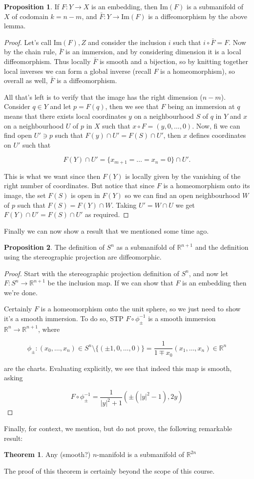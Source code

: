 \documentclass{article}
\theoremstyle{definition}
\newtheorem{proposition}{Proposition}
\newtheorem{theorem}{Theorem}
\begin{document}
\begin{proposition}
If $F: Y \to X$ is an embedding, then $\text{Im}(F)$ is a submanifold of $X$ of
codomain $k = n - m$, and $\bar{F} : Y \to \text{Im}(F)$ is a diffeomorphism by
the above lemma.
\end{proposition}

\begin{proof}
Let's call $\text{Im}(F), Z$ and consider the inclusion $i$ such that $i \circ
\bar{F} = F$. Now by the chain rule, $\bar{F}$ is an immersion, and by
considering dimension it is a local diffeomorphism. Thus locally $\bar{F}$ is
smooth and a bijection, so by knitting together local inverses we can form a
global inverse (recall $F$ is a homeomorphism), so overall as well, $\bar{F}$ is
a diffeomorphism.

All that's left is to verify that the image has the right dimension ($n - m$). Consider $q
\in Y$ and let $p = F(q)$, then we see that $F$ being an immersion at $q$ means
that there exists local coordinates $y$ on a neighbourhood $S$ of $q$ in $Y$ and
$x$ on a neighbourhood $U$ of $p$ in $X$ such that $x \circ F = (y, 0, \dots,
0)$. Now, fi we can find open $U' \ni p$ such that $F(y) \cap U' = F(S) \cap
U'$, then $x$ defines coordinates on $U'$ such that

$$ F(Y) \cap U' = \{x_{m + 1} = \dots = x_n = 0\} \cap U'. $$

This is what we want since then $F(Y)$ is locally given by the vanishing of the
right number of coordinates. But notice that since $F$ is a homeomorphism onto
its image, the set $F(S)$ is open in $F(Y)$ so we can find an open neighbourhood
$W$ of $p$ such that $F(S) = F(Y) \cap W$. Taking $U' = W \cap U$ we get $F(Y)
\cap U' = F(S) \cap U'$ as required.
\end{proof}

Finally we can now show a result that we mentioned some time ago.

\begin{proposition}
The definition of $S^n$ as a submanifold of $\mathbb{R}^{n + 1}$ and the
definition using the stereographic projection are diffeomorphic.
\end{proposition}
\begin{proof}
Start with the stereographic projection definition of $S^n$, and now let $F :
S^n \to \mathbb{R}^{n + 1}$ be the inclusion map. If we can show that $F$ is an
embedding then we're done.

Certainly $F$ is a homeomorphism onto the unit sphere, so we just need to show
it's a smooth immersion. To do so, STP $F \circ \phi_{\pm}^{-1}$ is a smooth
immersion $\mathbb{R}^n \to \mathbb{R}^{n + 1}$, where 

$$ \phi_\pm : (x_0, \dots, x_n) \in S^n \setminus \{(\pm 1, 0, \dots, 0)\} =
\frac{1}{1 \mp x_0} (x_1, \dots, x_n) \in \mathbb{R}^n $$

are the charts. Evaluating explicitly, we see that indeed this map is smooth,
asking

$$ F \circ \phi_\pm^{-1} = \frac{1}{|y|^2 + 1} (\pm (|y|^2 - 1), 2y) $$
\end{proof}

Finally, for context, we mention, but do not prove, the following remarkable
result:

\begin{theorem}
  Any (smooth?) $n$-manifold is a submanifold of $\mathbb{R}^{2n}$
\end{theorem}

The proof of this theorem is certainly beyond the scope of this course.
\end{document}

